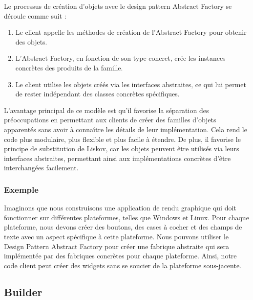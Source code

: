 Le processus de création d'objets avec le design pattern Abstract Factory se déroule comme suit :

\begin{enumerate}[leftmargin=*,labelsep=3mm]
    \item Le client appelle les méthodes de création de l'Abstract Factory pour obtenir des objets.
    \item L'Abstract Factory, en fonction de son type concret, crée les instances concrètes des produits de la famille.
    \item Le client utilise les objets créés via les interfaces abstraites, ce qui lui permet de rester indépendant des classes concrètes spécifiques.
\end{enumerate}

L'avantage principal de ce modèle est qu'il favorise la séparation des préoccupations en permettant aux clients de créer des familles d'objets apparentés sans avoir à connaître les détails de leur implémentation. Cela rend le code plus modulaire, plus flexible et plus facile à étendre. De plus, il favorise le principe de substitution de Liskov, car les objets peuvent être utilisés via leurs interfaces abstraites, permettant ainsi aux implémentations concrètes d'être interchangées facilement.

\subsubsection{Exemple}

Imaginons que nous construisons une application de rendu graphique qui doit fonctionner sur différentes plateformes, telles que Windows et Linux. Pour chaque plateforme, nous devons créer des boutons, des cases à cocher et des champs de texte avec un aspect spécifique à cette plateforme. Nous pouvons utiliser le Design Pattern Abstract Factory pour créer une fabrique abstraite qui sera implémentée par des fabriques concrètes pour chaque plateforme. Ainsi, notre code client peut créer des widgets sans se soucier de la plateforme sous-jacente.






\newpage

\subsection{Builder}

